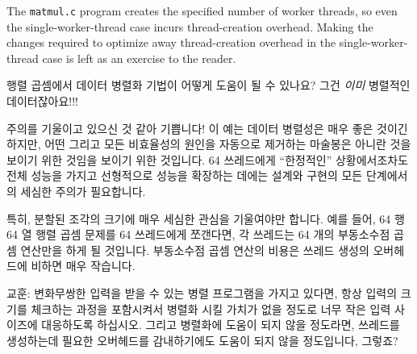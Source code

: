 \begin{enumerate}
	The \texttt{matmul.c} program creates the specified number of
	worker threads, so even the single-worker-thread case incurs
	thread-creation overhead.
	Making the changes required to optimize away thread-creation
	overhead in the single-worker-thread case is left as an
	exercise to the reader.
	\fi

\QuickQ{}
	행렬 곱셈에서 데이터 병렬화 기법이 어떻게 도움이 될 수 있나요?
	그건 \emph{이미} 병렬적인 데이터잖아요!!!

\QuickA{}
	주의를 기울이고 있으신 것 같아 기쁩니다!
	이 예는 데이터 병렬성은 매우 좋은 것이긴 하지만, 어떤 그리고 모든
	비효율성의 원인을 자동으로 제거하는 마술봉은 아니란 것을 보이기 위한
	것임을 보이기 위한 것입니다.
	64 쓰레드에게 ``한정적인'' 상황에서조차도 전체 성능을 가지고 선형적으로
	성능을 확장하는 데에는 설계와 구현의 모든 단계에서의 세심한 주의가
	필요합니다.

	특히, 분할된 조각의 크기에 매우 세심한 관심을 기울여야만 합니다.
	예를 들어, 64 행 64 열 행렬 곱셈 문제를 64 쓰레드에게 쪼갠다면, 각
	쓰레드는 64 개의 부동소수점 곱셈 연산만을 하게 될 것입니다.
	부동소수점 곱셈 연산의 비용은 쓰레드 생성의 오버헤드에 비하면 매우
	작습니다.

	교훈: 변화무쌍한 입력을 받을 수 있는 병렬 프로그램을 가지고 있다면,
	항상 입력의 크기를 체크하는 과정을 포함시켜서 병렬화 시킬 가치가 없을
	정도로 너무 작은 입력 사이즈에 대응하도록 하십시오.
	그리고 병렬화에 도움이 되지 않을 정도라면, 쓰레드를 생성하는데 필요한
	오버헤드를 감내하기에도 도움이 되지 않을 정도입니다, 그렇죠?

\end{enumerate}
